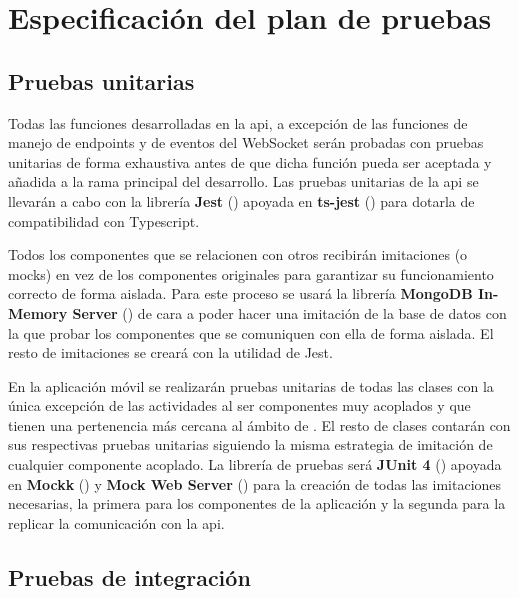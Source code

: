 \chapter{Especificación del plan de pruebas}
\label{ch:especificacion_plan_pruebas}

\section{Pruebas unitarias}

Todas las funciones desarrolladas en la \acrshort{api}, a excepción de las funciones de manejo de \glspl{endpoint} y de eventos del WebSocket serán probadas con pruebas unitarias de forma exhaustiva antes de que dicha función pueda ser aceptada y añadida a la rama principal del desarrollo. Las pruebas unitarias de la \acrshort{api} se llevarán a cabo con la librería \textbf{Jest} () apoyada en \textbf{ts-jest} () para dotarla de compatibilidad con Typescript.

Todos los componentes que se relacionen con otros recibirán imitaciones (o \glspl{mock}) en vez de los componentes originales para garantizar su funcionamiento correcto de forma aislada. Para este proceso se usará la librería \textbf{MongoDB In-Memory Server} () de cara a poder hacer una imitación de la base de datos con la que probar los componentes que se comuniquen con ella de forma aislada. El resto de imitaciones se creará con la utilidad de Jest.

En la aplicación móvil se realizarán pruebas unitarias de todas las clases con la única excepción de las actividades al ser componentes muy acoplados y que tienen una pertenencia más cercana al ámbito de . El resto de clases contarán con sus respectivas pruebas unitarias siguiendo la misma estrategia de imitación de cualquier componente acoplado. La librería de pruebas será \textbf{JUnit 4} () apoyada en \textbf{Mockk} () y \textbf{Mock Web Server} () para la creación de todas las imitaciones necesarias, la primera para los componentes de la aplicación y la segunda para la replicar la comunicación con la \acrshort{api}.

\section{Pruebas de integración}
\label{sec:pruebas_integracion}

